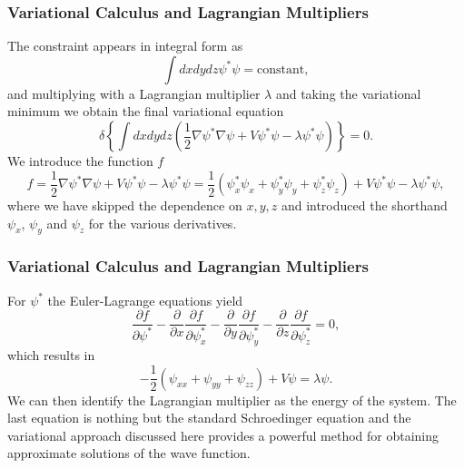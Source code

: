 \documentclass{beamer}
\begin{document}
\begin{frame}
\frametitle{Variational Calculus and Lagrangian Multipliers}

\begin{block}{}
The constraint appears in integral form as 
\[
 \int dxdydz \psi^* \psi=\mathrm{constant},
\]
and multiplying with a Lagrangian multiplier $\lambda$ and taking the variational minimum we obtain the final variational equation
\[
\delta \left\{\int dxdydz\left( \frac{1}{2}\nabla\psi^*\nabla\psi+V\psi^*\psi-\lambda\psi^*\psi\right)\right\} = 0.
\]
We introduce the function  $f$
\[
  f =  \frac{1}{2}\nabla\psi^*\nabla\psi+V\psi^*\psi-\lambda\psi^*\psi=
\frac{1}{2}(\psi^*_x\psi_x+\psi^*_y\psi_y+\psi^*_z\psi_z)+V\psi^*\psi-\lambda\psi^*\psi,
\]
where we have skipped the dependence on $x,y,z$ and introduced the shorthand $\psi_x$, $\psi_y$ and $\psi_z$  for the various derivatives.
\end{block}
\end{frame}

\begin{frame}
\frametitle{Variational Calculus and Lagrangian Multipliers}

\begin{block}{}
For $\psi^*$ the Euler-Lagrange  equations yield
\[
\frac{\partial f}{\partial \psi^*}- \frac{\partial }{\partial x}\frac{\partial f}{\partial \psi^*_x}-\frac{\partial }{\partial y}\frac{\partial f}{\partial \psi^*_y}-\frac{\partial }{\partial z}\frac{\partial f}{\partial \psi^*_z}=0,
\] 
which results in 
\[
    -\frac{1}{2}(\psi_{xx}+\psi_{yy}+\psi_{zz})+V\psi=\lambda \psi.
\]
We can then identify the  Lagrangian multiplier as the energy of the system. The last equation is 
nothing but the standard 
Schroedinger equation and the variational  approach discussed here provides 
a powerful method for obtaining approximate solutions of the wave function.
\end{block}
\end{frame}
\end{document}
